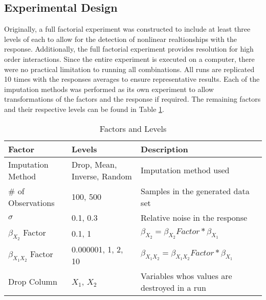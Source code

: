 \documentclass[../../paper.tex]{subfiles}
\begin{document}
\subsection{Experimental Design}
Originally, a full factorial experiment was constructed to include at least three levels of each to allow for the detection of nonlinear realtionships with the response.
Additionally, the full factorial experiment provides resolution for high order interactions. Since the entire experiment is executed on a computer, there were no practical limitation to running all combinations.
All runs are replicated 10 times with the responses averages to ensure representative results.
Each of the imputation methods was performed as its own experiment to allow transformations of the factors and the response if required. The remaining factors and their respective levels can be found in Table \ref{table:factors_and_levels}.


\begin{table}[H]
\begin{center}\label{table:factors_and_levels}
    \begin{tabular}{  l | p{1.9in} | l   }

      \rule{0pt}{14pt} \textbf{Factor} & \textbf{Levels} & \textbf{Description} \\ \hline
      \rule{0pt}{14pt} Imputation Method & Drop, Mean, Inverse, Random & Imputation method used \\ %
      \rule{0pt}{14pt} \# of Observations & 100, 500 &  Samples in the generated data set \\ %
      \rule{0pt}{14pt} $\sigma$ & 0.1, 0.3 &  Relative noise in the response \\ %
      \rule{0pt}{14pt} $\beta_{X_{2}}$ Factor & 0.1, 1 &  $\beta_{X_{2}} = \beta_{X_{2}} Factor * \beta_{X_{1}}$ \\ %
      \rule{0pt}{14pt} $\beta_{X_{1}X_{2}}$ Factor & 0.000001, 1, 2, 10 &  $\beta_{X_{1}X_{2}} = \beta_{X_{1}X_{2}} Factor * \beta_{X_{1}}$ \\ %
      \rule{0pt}{14pt} Drop Column & $X_{1}$, $X_{2}$ & Variables whos values are destroyed in a run \\ %
    \end{tabular}
    \caption{Factors and Levels}\label{table:factors_and_levels}
\end{center}
\end{table}
\end{document}
